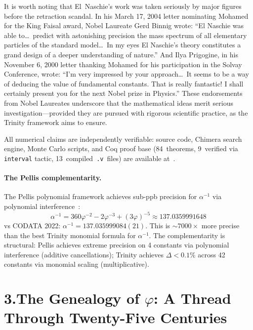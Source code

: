 \documentclass[10pt,a4paper]{article}
\begin{document}
It is worth noting that El~Naschie's work was taken seriously by major figures before the
retraction scandal. In his March 17, 2004 letter nominating Mohamed for the King Faisal award,
Nobel Laureate Gerd Binnig wrote: ``El Naschie was able to\ldots\ predict with astonishing
precision the mass spectrum of all elementary particles of the standard model\ldots\ In my
eyes El Naschie's theory constitutes a grand design of a deeper understanding of nature.''
And Ilya Prigogine, in his November 6, 2000 letter thanking Mohamed for his participation
in the Solvay Conference, wrote: ``I'm very impressed by your approach\ldots\ It seems to be
a way of deducing the value of fundamental constants. That is really fantastic! I shall
certainly present you for the next Nobel prize in Physics.'' These endorsements from Nobel
Laureates underscore that the mathematical ideas merit serious investigation---provided they
are pursued with rigorous scientific practice, as the Trinity framework aims to ensure.

All numerical claims are independently verifiable:
source code, Chimera search engine, Monte Carlo
scripts, and Coq proof base (84~theorems,
9~verified via \texttt{interval} tactic,
13~compiled~\texttt{.v}~files) are
available at~\cite{trinity2026}.

\paragraph{The Pellis complementarity.}
The Pellis polynomial framework achieves sub-ppb precision for $\alpha^{-1}$ via polynomial
interference~\cite{pellis2021}:
\begin{equation}
  \alpha^{-1} = 360\varphi^{-2} - 2\varphi^{-3} + (3\varphi)^{-5} \approx 137.0359991648
  \label{eq:pellis}
\end{equation}
vs CODATA 2022: $\alpha^{-1} = 137.035999084(21)$. This is $\sim 7000\times$ more precise
than the best Trinity monomial formula for $\alpha^{-1}$. The complementarity is structural:
Pellis achieves extreme precision on 4 constants via polynomial interference (additive cancellations);
Trinity achieves $\Delta < 0.1\%$ across 42 constants via monomial scaling (multiplicative).

\section*{3.\quad The Genealogy of $\varphi$: A Thread Through Twenty-Five Centuries}
\end{document}
